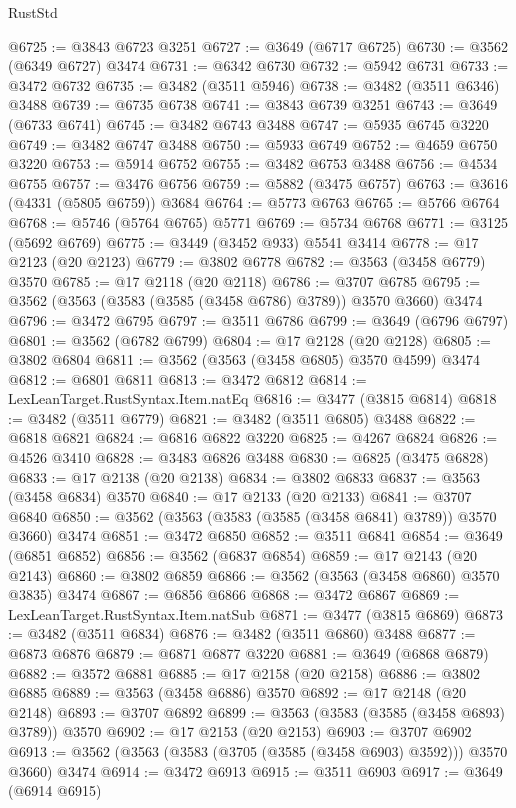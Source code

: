 \begin{lexlean}{RustStd}
\begin{coremodule}
@6725 := @3843 @6723 @3251
@6727 := @3649 (@6717 @6725)
@6730 := @3562 (@6349 @6727) @3474
@6731 := @6342 @6730
@6732 := @5942 @6731
@6733 := @3472 @6732
@6735 := @3482 (@3511 @5946)
@6738 := @3482 (@3511 @6346) @3488
@6739 := @6735 @6738
@6741 := @3843 @6739 @3251
@6743 := @3649 (@6733 @6741)
@6745 := @3482 @6743 @3488
@6747 := @5935 @6745 @3220
@6749 := @3482 @6747 @3488
@6750 := @5933 @6749
@6752 := @4659 @6750 @3220
@6753 := @5914 @6752
@6755 := @3482 @6753 @3488
@6756 := @4534 @6755
@6757 := @3476 @6756
@6759 := @5882 (@3475 @6757)
@6763 := @3616 (@4331 (@5805 @6759)) @3684
@6764 := @5773 @6763
@6765 := @5766 @6764
@6768 := @5746 (@5764 @6765) @5771
@6769 := @5734 @6768
@6771 := @3125 (@5692 @6769)
@6775 := @3449 (@3452 @933) @5541 @3414
@6778 := @17 @2123 (@20 @2123)
@6779 := @3802 @6778
@6782 := @3563 (@3458 @6779) @3570
@6785 := @17 @2118 (@20 @2118)
@6786 := @3707 @6785
@6795 := @3562 (@3563 (@3583 (@3585 (@3458 @6786) @3789)) @3570 @3660) @3474
@6796 := @3472 @6795
@6797 := @3511 @6786
@6799 := @3649 (@6796 @6797)
@6801 := @3562 (@6782 @6799)
@6804 := @17 @2128 (@20 @2128)
@6805 := @3802 @6804
@6811 := @3562 (@3563 (@3458 @6805) @3570 @4599) @3474
@6812 := @6801 @6811
@6813 := @3472 @6812
@6814 := LexLeanTarget.RustSyntax.Item.natEq
@6816 := @3477 (@3815 @6814)
@6818 := @3482 (@3511 @6779)
@6821 := @3482 (@3511 @6805) @3488
@6822 := @6818 @6821
@6824 := @6816 @6822 @3220
@6825 := @4267 @6824
@6826 := @4526 @3410
@6828 := @3483 @6826 @3488
@6830 := @6825 (@3475 @6828)
@6833 := @17 @2138 (@20 @2138)
@6834 := @3802 @6833
@6837 := @3563 (@3458 @6834) @3570
@6840 := @17 @2133 (@20 @2133)
@6841 := @3707 @6840
@6850 := @3562 (@3563 (@3583 (@3585 (@3458 @6841) @3789)) @3570 @3660) @3474
@6851 := @3472 @6850
@6852 := @3511 @6841
@6854 := @3649 (@6851 @6852)
@6856 := @3562 (@6837 @6854)
@6859 := @17 @2143 (@20 @2143)
@6860 := @3802 @6859
@6866 := @3562 (@3563 (@3458 @6860) @3570 @3835) @3474
@6867 := @6856 @6866
@6868 := @3472 @6867
@6869 := LexLeanTarget.RustSyntax.Item.natSub
@6871 := @3477 (@3815 @6869)
@6873 := @3482 (@3511 @6834)
@6876 := @3482 (@3511 @6860) @3488
@6877 := @6873 @6876
@6879 := @6871 @6877 @3220
@6881 := @3649 (@6868 @6879)
@6882 := @3572 @6881
@6885 := @17 @2158 (@20 @2158)
@6886 := @3802 @6885
@6889 := @3563 (@3458 @6886) @3570
@6892 := @17 @2148 (@20 @2148)
@6893 := @3707 @6892
@6899 := @3563 (@3583 (@3585 (@3458 @6893) @3789)) @3570
@6902 := @17 @2153 (@20 @2153)
@6903 := @3707 @6902
@6913 := @3562 (@3563 (@3583 (@3705 (@3585 (@3458 @6903) @3592))) @3570 @3660) @3474
@6914 := @3472 @6913
@6915 := @3511 @6903
@6917 := @3649 (@6914 @6915)

\end{coremodule}
\end{lexlean}
